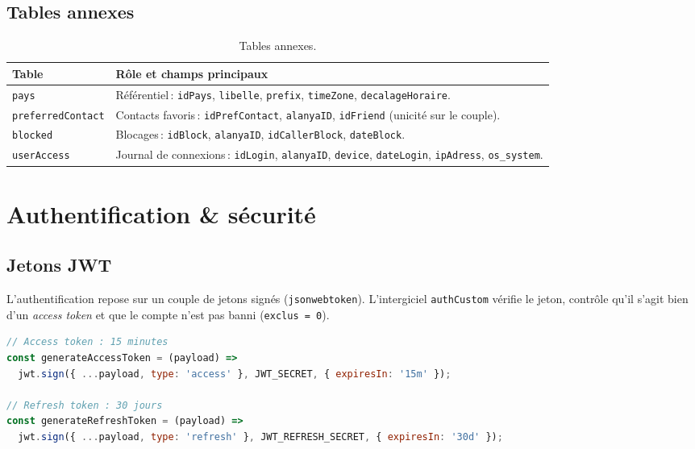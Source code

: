 \documentclass[11pt,a4paper,oneside]{report}
\newcommand{\thd}[1]{\textbf{\textcolor{AlanyaIndigoDark}{#1}}}
\begin{document}
\subsection{Tables annexes}
\begin{table}[H]
\centering
\begin{tabularx}{\linewidth}{@{}l X@{}}
\toprule
\thd{Table} & \thd{R\^{o}le et champs principaux}\\
\midrule
\texttt{pays}             & R\'{e}f\'{e}rentiel\,: \texttt{idPays}, \texttt{libelle}, \texttt{prefix}, \texttt{timeZone}, \texttt{decalageHoraire}.\\
\texttt{preferredContact} & Contacts favoris\,: \texttt{idPrefContact}, \texttt{alanyaID}, \texttt{idFriend} (unicit\'{e} sur le couple).\\
\texttt{blocked}          & Blocages\,: \texttt{idBlock}, \texttt{alanyaID}, \texttt{idCallerBlock}, \texttt{dateBlock}.\\
\texttt{userAccess}       & Journal de connexions\,: \texttt{idLogin}, \texttt{alanyaID}, \texttt{device}, \texttt{dateLogin}, \texttt{ipAdress}, \texttt{os\_system}.\\
\bottomrule
\end{tabularx}
\caption{Tables annexes.}
\end{table}

\section{Authentification \& s\'{e}curit\'{e}}
\subsection{Jetons JWT}
L'authentification repose sur un couple de jetons sign\'{e}s
(\texttt{jsonwebtoken}). L'intergiciel \texttt{authCustom} v\'{e}rifie le jeton,
contr\^{o}le qu'il s'agit bien d'un \emph{access token} et que le compte n'est
pas banni (\texttt{exclus = 0}).

\begin{lstlisting}[language=JavaScript,caption={G\'{e}n\'{e}ration des jetons (src/middleware/authCustom.js)},captionpos=b]
// Access token : 15 minutes
const generateAccessToken = (payload) =>
  jwt.sign({ ...payload, type: 'access' }, JWT_SECRET, { expiresIn: '15m' });

// Refresh token : 30 jours
const generateRefreshToken = (payload) =>
  jwt.sign({ ...payload, type: 'refresh' }, JWT_REFRESH_SECRET, { expiresIn: '30d' });
\end{lstlisting}
\end{document}
